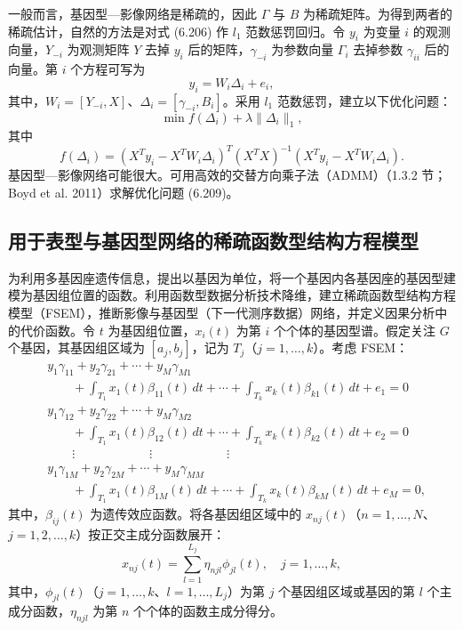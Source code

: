 一般而言，基因型—影像网络是稀疏的，因此 $\Gamma$ 与 $B$ 为稀疏矩阵。为得到两者的稀疏估计，自然的方法是对式 (6.206) 作 $l_1$ 范数惩罚回归。令 $y_i$ 为变量 $i$ 的观测向量，$Y_{-i}$ 为观测矩阵 $Y$ 去掉 $y_i$ 后的矩阵，$\gamma_{-i}$ 为参数向量 $\Gamma_i$ 去掉参数 $\gamma_{ii}$ 后的向量。第 $i$ 个方程可写为
\begin{equation}
y_i=W_i\Delta_i+e_i,
\tag{6.208}
\end{equation}
其中，$W_i=[Y_{-i},X]$、$\Delta_i=[\gamma_{-i},B_i]$。采用 $l_1$ 范数惩罚，建立以下优化问题：
\begin{equation}
\min f(\Delta_i)+\lambda\lVert\Delta_i\rVert_1,
\tag{6.209}
\end{equation}
其中
\[
f(\Delta_i)=(X^Ty_i-X^TW_i\Delta_i)^T(X^TX)^{-1}(X^Ty_i-X^TW_i\Delta_i).
\]
基因型—影像网络可能很大。可用高效的交替方向乘子法（ADMM）（1.3.2 节；Boyd et al. 2011）求解优化问题 (6.209)。

\subsection{用于表型与基因型网络的稀疏函数型结构方程模型}

为利用多基因座遗传信息，提出以基因为单位，将一个基因内各基因座的基因型建模为基因组位置的函数。利用函数型数据分析技术降维，建立稀疏函数型结构方程模型（FSEM），推断影像与基因型（下一代测序数据）网络，并定义因果分析中的代价函数。令 $t$ 为基因组位置，$x_i(t)$ 为第 $i$ 个个体的基因型谱。假定关注 $G$ 个基因，其基因组区域为 $[a_j,b_j]$，记为 $T_j$（$j=1,\ldots,k$）。考虑 FSEM：
\begin{equation}
\begin{aligned}
&y_1\gamma_{11}+y_2\gamma_{21}+\cdots+y_M\gamma_{M1}\\
&\qquad+\int_{T_1}x_1(t)\beta_{11}(t)\,dt+\cdots+\int_{T_k}x_k(t)\beta_{k1}(t)\,dt+e_1=0\\
&y_1\gamma_{12}+y_2\gamma_{22}+\cdots+y_M\gamma_{M2}\\
&\qquad+\int_{T_1}x_1(t)\beta_{12}(t)\,dt+\cdots+\int_{T_k}x_k(t)\beta_{k2}(t)\,dt+e_2=0\\
&\qquad\vdots\qquad\qquad\qquad\vdots\qquad\qquad\qquad\vdots\\
&y_1\gamma_{1M}+y_2\gamma_{2M}+\cdots+y_M\gamma_{MM}\\
&\qquad+\int_{T_1}x_1(t)\beta_{1M}(t)\,dt+\cdots+\int_{T_k}x_k(t)\beta_{kM}(t)\,dt+e_M=0,
\end{aligned}\tag{6.210}
\end{equation}
其中，$\beta_{ij}(t)$ 为遗传效应函数。将各基因组区域中的 $x_{nj}(t)$（$n=1,\ldots,N$、$j=1,2,\ldots,k$）按正交主成分函数展开：
\begin{equation}
x_{nj}(t)=\sum_{l=1}^{L_j}\eta_{njl}\phi_{jl}(t),\quad j=1,\ldots,k,
\tag{6.211}
\end{equation}
其中，$\phi_{jl}(t)$（$j=1,\ldots,k$、$l=1,\ldots,L_j$）为第 $j$ 个基因组区域或基因的第 $l$ 个主成分函数，$\eta_{njl}$ 为第 $n$ 个个体的函数主成分得分。

